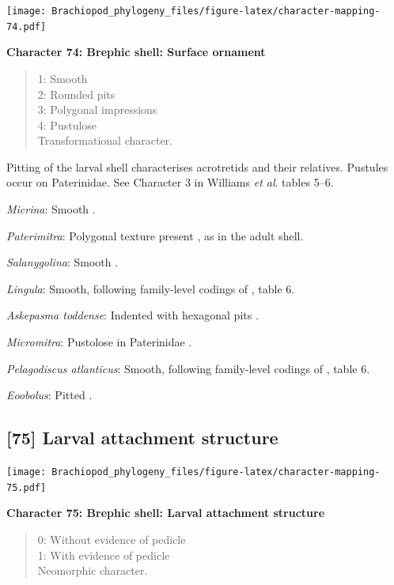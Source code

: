 \documentclass[]{book}
\theoremstyle{definition}
\theoremstyle{definition}
\theoremstyle{definition}
\theoremstyle{remark}
\begin{document}
\texttt{[image: Brachiopod\_phylogeny\_files/figure-latex/character-mapping-74.pdf]}

\textbf{Character 74: Brephic shell: Surface ornament}

\begin{quote}
1: Smooth\\
2: Rounded pits\\
3: Polygonal impressions\\
4: Pustulose\\
Transformational character.
\end{quote}

Pitting of the larval shell characterises acrotretids and their
relatives. Pustules occur on Paterinidae. See Character 3 in Williams
\emph{et al}. \citeyearpar{Williams2000BrachiopodaLinguliformea} tables
5--6.

\emph{Micrina}: Smooth \citep{Holmer2011Firstrecord}.

\emph{Paterimitra}: Polygonal texture present
\citep{Holmer2011Firstrecord}, as in the adult shell.

\emph{Salanygolina}: Smooth \citep{Holmer2009Theenigmatic}.

\emph{Lingula}: Smooth, following family-level codings of
\citet{Williams2000BrachiopodaLinguliformea}, table 6.

\emph{Askepasma toddense}: Indented with hexagonal pits \citep[appendix
2]{Williams1998Thediversity}.

\emph{Micromitra}: Pustolose in Paterinidae \citep[table
6]{Williams2000BrachiopodaLinguliformea}.

\emph{Pelagodiscus atlanticus}: Smooth, following family-level codings
of \citet{Williams2000BrachiopodaLinguliformea}, table 6.

\emph{Eoobolus}: Pitted \citep[table
8]{Williams2000BrachiopodaLinguliformea}.

\hypertarget{larval-attachment-structure}{%
\subsection*{{[}75{]} Larval attachment
structure}\label{larval-attachment-structure}}

\texttt{[image: Brachiopod\_phylogeny\_files/figure-latex/character-mapping-75.pdf]}

\textbf{Character 75: Brephic shell: Larval attachment structure}

\begin{quote}
0: Without evidence of pedicle\\
1: With evidence of pedicle\\
Neomorphic character.
\end{quote}
\end{document}
